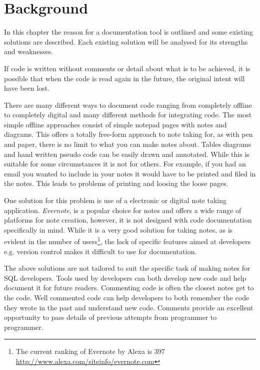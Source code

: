 \chapter{Background}\label{background}

In this chapter the reason for a documentation tool is outlined and some
existing solutions are described. Each existing solution will be analysed for
its strengths and weaknesses.

If code is written without comments or detail about what is to be
achieved, it is possible that when the code is read again in the future, the
original intent will have been lost. 

There are many different ways to document code ranging from
completely offline to completely digital and many different methods for
integrating code. The most simple offline approaches consist of simple
notepad pages with notes and diagrams. This offers a totally free-form
approach to note taking for, as with pen and paper, there is no limit to what
you can make notes about. Tables diagrams and hand written pseudo code
can be easily drawn and annotated. While this is suitable for some
circumstances it is not for others. For example, if you had an email you wanted
to include in your notes it would have to be printed and filed in the notes.
This leads to problems of printing and loosing the loose pages.

One solution for this problem is use of a electronic or digital
note taking application. \textit{Evernote}\cite{evernote}, is a popular choice for notes and offers
a wide range of platforms for note creation, however, it is not designed with code
documentation specifically in mind. While it is a very good solution for taking
notes, as is evident in the number of users\footnote{The current ranking of
Evernote by Alexa is 397
\href{http://www.alexa.com/siteinfo/evernote.com}{http://www.alexa.com/siteinfo/evernote.com}},
the lack of specific features aimed at developers e.g. version control makes it
difficult to use for documentation.

The above solutions are not tailored to suit the specific task of making notes
for SQL developers. Tools used by developers can both develop new code and help
document it for future readers. Commenting code is often the closest notes get
to the code. Well commented code can help developers to both remember the code
they wrote in the past and understand new code. Comments provide an excellent
opportunity to pass details of previous attempts from programmer to programmer.

